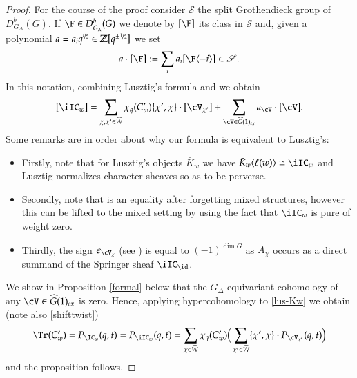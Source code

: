 \documentclass[12pt]{amsart}
\theoremstyle{remark}
\begin{document}
\begin{proof}
% 
For the course of the proof consider $\mathscr S$ the split Grothendieck group of $D^b_{G_{\Delta}}(G)$. If $\F \in D^b_{G_{\Delta}}(G)$ we denote by $[\F]$ its class in $\mathscr S$ and, given a polynomial $a = a_i q^{\nicefrac{i}{2}} \in \mathbb{Z}[q^{\pm \nicefrac{1}{2}}]$ we set
\[
a \cdot [\F] := \sum_i a_i [\F \langle -i \rangle ] \in \mathscr S.
\]
In this notation, combining Lusztig's formula \cite[14.11]{LusCSIII} and \cite[23.1]{LusCSV} we obtain
\begin{equation} \label{lus-Kw}
[\iIC_w] = \sum_{\chi, \chi^{\prime} \in \widehat W} \chi_q (C_w^{\prime}) \{ \chi^{\prime}, \chi \} \cdot [\cV_{\chi'}]  +  \sum_{\cV \in \widehat{ G}(1)_{ex}} a_{\cV} \cdot  [\cV].
\end{equation}
Some remarks are in order about why our formula is equivalent to Lusztig's:
\begin{itemize}
  \item  Firstly, note that for Lusztig's objects $\bar K_{w}$ we have $\bar
  K_{w} \langle \ell(w)\rangle \cong \iIC_w$ and Lusztig normalizes
  character sheaves so as to be perverse.  
\item Secondly, note that
  \cite[14.11]{LusCSIII} is an equality after forgetting mixed
  structures, however this can be lifted to the mixed setting by using
  the fact that $\iIC_w$ is pure of weight zero. 
\item Thirdly, the sign
  $\epsilon_{\cV_{\chi}}$ (see \cite[13.10]{LusCSIII}) is equal to
  $(-1)^{\dim G}$ as $A_{\chi}$ occurs as a direct summand of the
  Springer sheaf $\iIC_{\id}$.
\end{itemize}


We show in Proposition \ref{formal} below that the $G_{\Delta}$-equivariant cohomology of any $\cV \in \widehat G(1)_{ex}$ is zero. Hence, applying hypercohomology to \eqref{lus-Kw} we obtain (note also \eqref{shifttwist})
\[
\Tr(C^{\prime}_w) =P_{\IC_w}(q,t)=P_{\iIC_w}(q,t)
=\sum_{\chi\in \widehat W} \chi_q(
C_w^{\prime} )\Big(\sum_{\chi^{\prime} \in \widehat
   W}\{\chi^{\prime},\chi\} \cdot P_{\cV_{\chi^{\prime}}}(q,t)\Big)
   \]
   and the proposition follows.
\end{proof}

\end{document}
